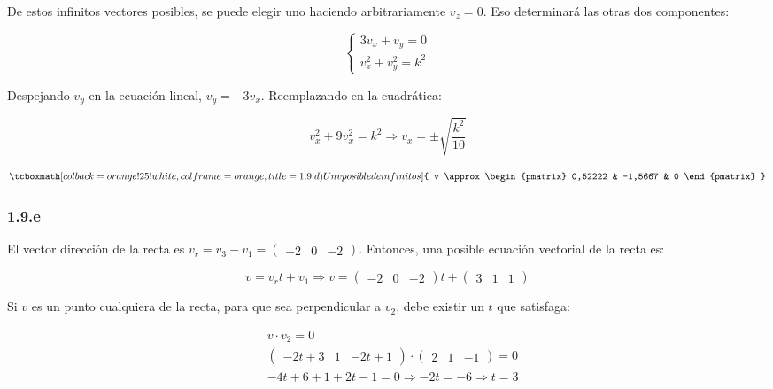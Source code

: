 \documentclass{article}
\begin{document}
De estos infinitos vectores posibles, se puede elegir uno haciendo arbitrariamente $v_z = 0$. Eso determinará las otras dos componentes:

\begin{equation}
\left\{
\begin{array}{ll}
3 v_x + v_y = 0 \\
v_x^2 + v_y^2 = k^2
\end{array}
\right.
\end{equation}

Despejando $v_y$ en la ecuación lineal, $v_y = -3 v_x$. Reemplazando en la cuadrática:

\begin{equation}
v_x^2 + 9 v_x^2 = k^2 \Rightarrow v_x = \pm \sqrt{\frac{k^2}{10}}
\end{equation}

\begin{equation}
\tcboxmath[colback=orange!25!white,colframe=orange,title=1.9.d) Un v posible de infinitos]
{ v \approx \begin{pmatrix}
0,52222 & -1,5667 & 0
\end{pmatrix} }
\end{equation}

\subsubsection*{1.9.e}
\label{subsubsec:1.9.e}

El vector dirección de la recta es $v_r = v_3 - v_1 = \begin{pmatrix} -2 & 0 & -2 \end{pmatrix}$. Entonces, una posible ecuación vectorial de la recta es:

\begin{equation}
v = v_r t + v_1 \Rightarrow v = \begin{pmatrix} -2 & 0 & -2 \end{pmatrix} t + \begin{pmatrix} 3 & 1 & 1 \end{pmatrix}
\end{equation}

Si $v$ es un punto cualquiera de la recta, para que sea perpendicular a $v_2$, debe existir un $t$ que satisfaga:

\begin{subequations}
\begin{align}
& v \cdot v_2 = 0 \\
& \begin{pmatrix} -2t+3 & 1 & -2t+1 \end{pmatrix} \cdot \begin{pmatrix} 2 & 1 & -1 \end{pmatrix} = 0 \\
& -4t + 6 + 1 + 2t -1 = 0 \Rightarrow -2t = -6 \Rightarrow t = 3
\end{align}
\end{subequations}
\end{document}
